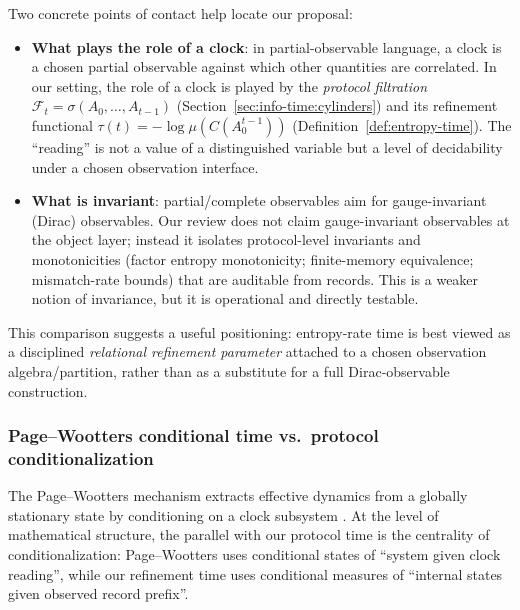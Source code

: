 Two concrete points of contact help locate our proposal:
\begin{itemize}[leftmargin=*,itemsep=2pt]
  \item \textbf{What plays the role of a clock}: in partial-observable language, a clock is a chosen partial observable against which other quantities are correlated. In our setting, the role of a clock is played by the \emph{protocol filtration} $\mathcal{F}_t=\sigma(A_0,\dots,A_{t-1})$ (Section~\ref{sec:info-time:cylinders}) and its refinement functional $\tau(t)=-\log\mu(C(A_0^{t-1}))$ (Definition~\ref{def:entropy-time}). The ``reading'' is not a value of a distinguished variable but a level of decidability under a chosen observation interface.
  \item \textbf{What is invariant}: partial/complete observables aim for gauge-invariant (Dirac) observables. Our review does not claim gauge-invariant observables at the object layer; instead it isolates protocol-level invariants and monotonicities (factor entropy monotonicity; finite-memory equivalence; mismatch-rate bounds) that are auditable from records. This is a weaker notion of invariance, but it is operational and directly testable.
\end{itemize}

This comparison suggests a useful positioning: entropy-rate time is best viewed as a disciplined \emph{relational refinement parameter} attached to a chosen observation algebra/partition, rather than as a substitute for a full Dirac-observable construction.

\subsubsection{Page--Wootters conditional time vs.\ protocol conditionalization}\label{sec:discussion:page-wootters}

The Page--Wootters mechanism extracts effective dynamics from a globally stationary state by conditioning on a clock subsystem \cite{PageWootters1983}. At the level of mathematical structure, the parallel with our protocol time is the centrality of conditionalization: Page--Wootters uses conditional states of ``system given clock reading'', while our refinement time uses conditional measures of ``internal states given observed record prefix''.


